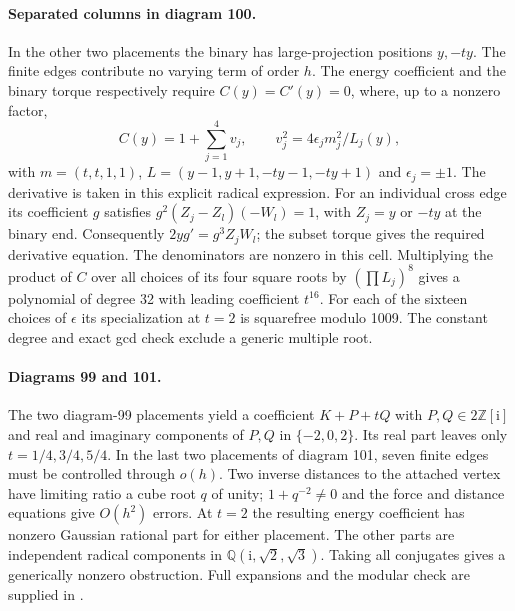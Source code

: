 \documentclass[11pt]{article}
\newcommand{\QQ}{\mathbb Q}
\begin{document}
\paragraph{Separated columns in diagram 100.}
In the other two placements the binary has large-projection positions $y,-ty$. The finite edges contribute no varying term of order $h$. The energy coefficient and the binary torque respectively require $C(y)=C'(y)=0$, where, up to a nonzero factor,
\[
 C(y)=1+\sum_{j=1}^4 v_j,\qquad v_j^2=4\epsilon_jm_j^2/L_j(y),
\]
with $m=(t,t,1,1)$, $L=(y-1,y+1,-ty-1,-ty+1)$ and $\epsilon_j=\pm1$. The derivative is taken in this explicit radical expression. For an individual cross edge its coefficient $g$ satisfies $g^2(Z_j-Z_l)(-W_l)=1$, with $Z_j=y$ or $-ty$ at the binary end. Consequently $2yg'=g^3Z_jW_l$; the subset torque gives the required derivative equation. The denominators are nonzero in this cell. Multiplying the product of $C$ over all choices of its four square roots by $(\prod L_j)^8$ gives a polynomial of degree 32 with leading coefficient $t^{16}$. For each of the sixteen choices of $\epsilon$ its specialization at $t=2$ is squarefree modulo 1009. The constant degree and exact gcd check exclude a generic multiple root.

\paragraph{Diagrams 99 and 101.}
The two diagram-99 placements yield a coefficient $K+P+tQ$ with $P,Q\in2\mathbb Z[\mathrm{i}]$ and real and imaginary components of $P,Q$ in $\{-2,0,2\}$. Its real part leaves only $t=1/4,3/4,5/4$. In the last two placements of diagram 101, seven finite edges must be controlled through $o(h)$. Two inverse distances to the attached vertex have limiting ratio a cube root $q$ of unity; $1+q^{-2}\ne0$ and the force and distance equations give $O(h^2)$ errors. At $t=2$ the resulting energy coefficient has nonzero Gaussian rational part for either placement. The other parts are independent radical components in $\QQ(\mathrm{i},\sqrt2,\sqrt3)$. Taking all conjugates gives a generically nonzero obstruction. Full expansions and the modular check are supplied in \cite{Supplement}.
\end{document}
